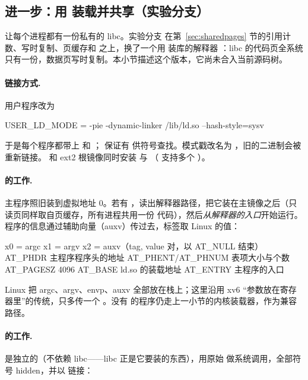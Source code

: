 \subsection{进一步：用  装载并共享（实验分支）}
\label{sec:ldso}

 让每个进程都有一份私有的 libc。实验分支  在第~\ref{sec:sharedpages} 节的引用计数、写时复制、页缓存和  之上，换了一个用  装库的解释器 ：libc 的代码页全系统只有一份，数据页写时复制。本小节描述这个版本，它尚未合入当前源码树。

\paragraph{链接方式.} 用户程序改为

\begin{makecode}
USER_LD_MODE = -pie -dynamic-linker /lib/ld.so --hash-style=sysv
\end{makecode}

于是每个程序都带上  和 ； 保证有  供符号查找。模式戳改名为 ，旧的二进制会被重新链接。 和 ext2 根镜像同时安装  与 （ 支持多个 ）。

\paragraph{ 的工作.} 主程序照旧装到虚拟地址 0。若有 ，读出解释器路径，把它装在主镜像之后（只读页同样取自页缓存，所有进程共用一份  代码），然后\emph{从解释器的入口}开始运行。程序的信息通过辅助向量（auxv）传过去，标签取 Linux 的值：

\begin{txtcode}
x0 = argc   x1 = argv   x2 = auxv（{tag, value} 对，以 AT_NULL 结束）
AT_PHDR    主程序程序头的地址        AT_PHENT/AT_PHNUM  表项大小与个数
AT_PAGESZ  4096                      AT_BASE            ld.so 的装载地址
AT_ENTRY   主程序的入口
\end{txtcode}

Linux 把 argc、argv、envp、auxv 全部放在栈上；这里沿用 xv6 “参数放在寄存器里”的传统，只多传一个 。没有  的程序仍走上一小节的内核装载器，作为兼容路径。

\paragraph{ 的工作.}  是独立的（不依赖 libc——libc 正是它要装的东西），用原始  做系统调用，全部符号 hidden，并以  链接：

